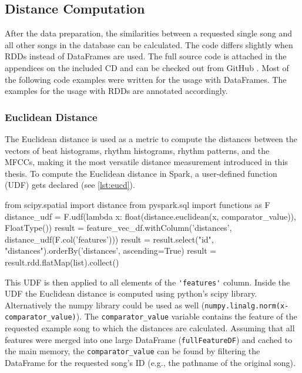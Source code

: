 \subsection{Distance Computation}

After the data preparation, the similarities between a requested single song and all other songs in the database can be calculated. The code differs slightly when RDDs instead of DataFrames are used. The full source code is attached in the appendices on the included CD and can be checked out from GitHub \cite{github-code}. Most of the following code examples were written for the usage with DataFrames. The examples for the usage with RDDs are annotated accordingly.\\

\subsubsection{Euclidean Distance}

The Euclidean distance is used as a metric to compute the distances between the vectors of beat histograms, rhythm histograms, rhythm patterns, and the MFCCs, making it the most versatile distance measurement introduced in this thesis. To compute the Euclidean distance in Spark, a user-defined function (UDF) gets declared (see \ref{lst:eucd}). 

\begin{pythonCode}[frame=single,label={lst:eucd},caption={Euclidean distance DF},captionpos=b]
from scipy.spatial import distance
from pyspark.sql import functions as F
distance_udf = F.udf(lambda x: float(distance.euclidean(x, comparator_value)), FloatType())
result = feature_vec_df.withColumn('distances', distance_udf(F.col('features')))
result = result.select("id", "distances").orderBy('distances', ascending=True)
result = result.rdd.flatMap(list).collect()
\end{pythonCode}

\noindent This UDF is then applied to all elements of the \lstinline{'features'} column. Inside the UDF the Euclidean distance is computed using python's scipy library. Alternatively the numpy library could be used as well (\lstinline{numpy.linalg.norm(x-comparator_value)}). The \lstinline{comparator_value} variable contains the feature of the requested example song to which the distances are calculated. Assuming that all features were merged into one large DataFrame (\lstinline{fullFeatureDF}) and cached to the main memory, the \lstinline{comparator_value} can be found by filtering the DataFrame for the requested song's ID (e.g., the pathname of the original song).

